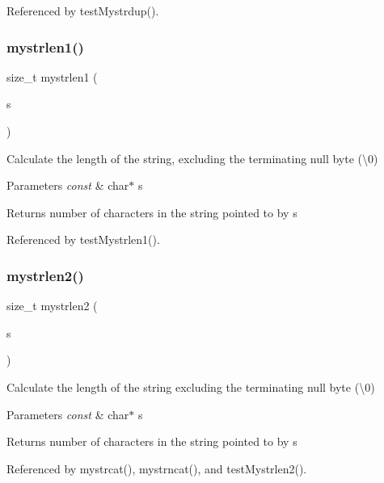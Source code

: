 Referenced by test\+Mystrdup().

\mbox{\label{mystring_8c_a71f9f1095f41990d202157923cfe578a}} 
\subsubsection{mystrlen1()}
{\footnotesize\ttfamily size\+\_\+t mystrlen1 (\begin{DoxyParamCaption}\item[{const char $\ast$}]{s }\end{DoxyParamCaption})}

Calculate the length of the string, excluding the terminating null byte (\textquotesingle{}\textbackslash{}0\textquotesingle{}) 
\begin{DoxyParams}{Parameters}
{\em const} & char$\ast$ s \\
\hline
\end{DoxyParams}
\begin{DoxyReturn}{Returns}
number of characters in the string pointed to by s 
\end{DoxyReturn}


Referenced by test\+Mystrlen1().

\mbox{\label{mystring_8c_a0553e98c4213b02262ce36a73cc9b088}} 
\subsubsection{mystrlen2()}
{\footnotesize\ttfamily size\+\_\+t mystrlen2 (\begin{DoxyParamCaption}\item[{const char $\ast$}]{s }\end{DoxyParamCaption})}

Calculate the length of the string excluding the terminating null byte (\textquotesingle{}\textbackslash{}0\textquotesingle{}) 
\begin{DoxyParams}{Parameters}
{\em const} & char$\ast$ s \\
\hline
\end{DoxyParams}
\begin{DoxyReturn}{Returns}
number of characters in the string pointed to by s 
\end{DoxyReturn}


Referenced by mystrcat(), mystrncat(), and test\+Mystrlen2().

